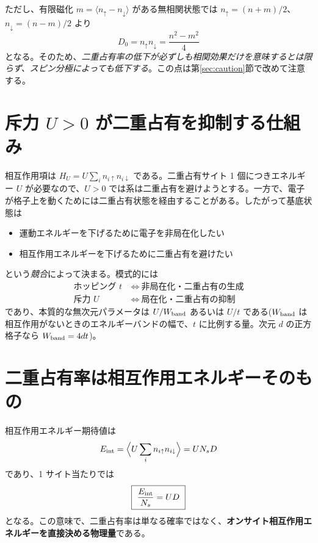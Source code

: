\documentclass[11pt,a4paper]{ltjsarticle}
\newcommand{\ev}[1]{\langle #1\rangle}
\newcommand{\up}{\uparrow}
\newcommand{\dn}{\downarrow}
\begin{document}
ただし、有限磁化 $m=\ev{n_\up-n_\dn}$ がある無相関状態では
$n_\up=(n+m)/2$、$n_\dn=(n-m)/2$ より
\begin{equation}
  D_0 = n_\up n_\dn = \frac{n^2-m^2}{4}
\end{equation}
となる。そのため、\emph{二重占有率の低下が必ずしも相関効果だけを意味するとは限らず、スピン分極によっても低下する}。この点は第\ref{sec:caution}節で改めて注意する。

\section{斥力 $U>0$ が二重占有を抑制する仕組み}

相互作用項は $H_U=U\sum_i n_{i\up}n_{i\dn}$ である。二重占有サイト 1 個につきエネルギー $U$ が必要なので、$U>0$ では系は二重占有を避けようとする。一方で、電子が格子上を動くためには二重占有状態を経由することがある。したがって基底状態は
\begin{itemize}
  \item 運動エネルギーを下げるために電子を非局在化したい
  \item 相互作用エネルギーを下げるために二重占有を避けたい
\end{itemize}
という\emph{競合}によって決まる。模式的には
\begin{align}
  \text{ホッピング } t &\ \Longleftrightarrow\ \text{非局在化・二重占有の生成}\\
  \text{斥力 } U &\ \Longleftrightarrow\ \text{局在化・二重占有の抑制}
\end{align}
であり、本質的な無次元パラメータは $U/W_{\rm band}$ あるいは $U/t$ である($W_{\rm band}$ は相互作用がないときのエネルギーバンドの幅で、$t$ に比例する量。次元 $d$ の正方格子なら $W_{\rm band}=4dt$)。

\section{二重占有率は相互作用エネルギーそのもの}
\label{sec:thermo}

相互作用エネルギー期待値は
\begin{equation}
  E_{\rm int} = \Bigl\langle U\sum_i n_{i\up}n_{i\dn}\Bigr\rangle = U N_s D
\end{equation}
であり、1 サイト当たりでは
\begin{equation}
  \boxed{\ \frac{E_{\rm int}}{N_s} = U D\ }
\end{equation}
となる。この意味で、二重占有率は単なる確率ではなく、\textbf{オンサイト相互作用エネルギーを直接決める物理量}である。
\end{document}
